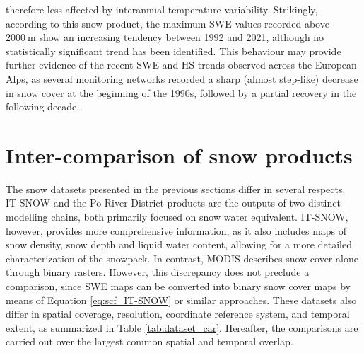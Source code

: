 therefore less affected by interannual temperature variability. Strikingly, according to this snow product, the maximum SWE values recorded above 
$\SI{2000}{\meter}$ show an increasing tendency between 1992 and 2021, although no statistically significant trend has been identified. This behaviour 
may provide further evidence of the recent SWE and HS trends observed across the European Alps, as several monitoring networks recorded a sharp (almost 
step-like) decrease in snow cover at the beginning of the 1990s, followed by a partial recovery in the following decade \parencite{Matiu_HS}. 










\section{Inter-comparison of snow products}

The snow datasets presented in the previous sections differ in several respects. IT-SNOW and the Po River District products are the outputs of two distinct modelling 
chains, both primarily focused on snow water equivalent. IT-SNOW, however, provides more comprehensive information, as it also includes maps 
of snow density, snow depth and liquid water content, allowing for a more detailed characterization of the snowpack. In contrast, MODIS describes 
snow cover alone through binary rasters. However, this discrepancy does not preclude a comparison, since SWE maps can be converted into binary snow cover 
maps by means of Equation \eqref{eq:scf_IT-SNOW} or similar approaches. These datasets also differ in spatial coverage, resolution, coordinate 
reference system, and temporal extent, as summarized in Table \ref{tab:dataset_car}. Hereafter, the comparisons are carried out over the largest 
common spatial and temporal overlap.

